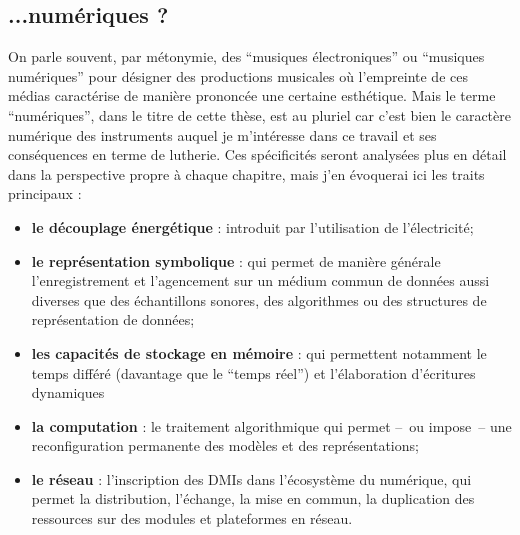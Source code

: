 \subsection{...numériques ?}

\indent On parle souvent, par métonymie, des ``musiques électroniques'' ou ``musiques numériques'' pour désigner des productions musicales où l'empreinte de ces médias caractérise de manière prononcée une certaine esthétique. Mais le terme ``numériques'', dans le titre de cette thèse, est au pluriel car c'est bien le caractère numérique des instruments auquel je m'intéresse dans ce travail et ses conséquences en terme de lutherie. Ces spécificités seront analysées plus en détail dans la perspective propre à chaque chapitre, mais j'en évoquerai ici les traits principaux :
\vspace{-1em}
\begin{itemize}[noitemsep]
\item \textbf{le découplage énergétique} : introduit par l'utilisation de l'électricité;
\item \textbf{le représentation symbolique} : qui permet de manière générale l'enregistrement et l'agencement sur un médium commun de données aussi diverses que des échantillons sonores, des algorithmes ou des structures de représentation de données;
\item \textbf{les capacités de stockage en mémoire} : qui permettent notamment le temps différé (davantage que le ``temps réel'') et l'élaboration d'écritures dynamiques 
\item \textbf{la computation} : le traitement algorithmique qui permet --~ou impose~-- une reconfiguration permanente des modèles et des représentations;
\item \textbf{le réseau} : l'inscription des \glspl{DMI} dans l'écosystème du numérique, qui permet la distribution, l'échange, la mise en commun, la duplication des ressources sur des modules et plateformes en réseau.
\end{itemize}

